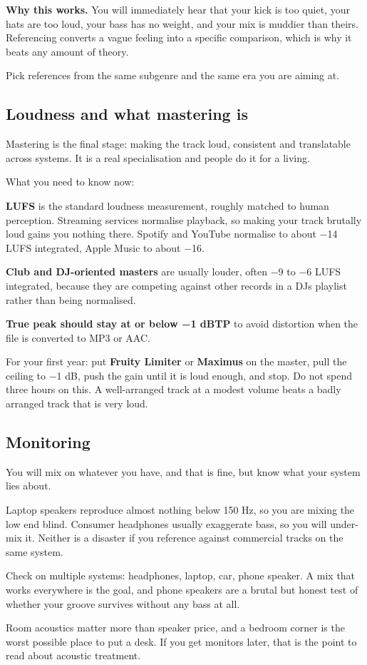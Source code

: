\begin{intuitionbox}
\textbf{Why this works.} You will immediately hear that your kick is too quiet, your hats are too
loud, your bass has no weight, and your mix is muddier than theirs. Referencing converts a
vague feeling into a specific comparison, which is why it beats any amount of theory.
\end{intuitionbox}

Pick references from the same subgenre and the same era you are aiming at.

\subsection{Loudness and what mastering is}\label{th07_mixing-loudness-and-what-mastering-is}

Mastering is the final stage: making the track loud, consistent and translatable across
systems. It is a real specialisation and people do it for a living.

What you need to know now:

\textbf{LUFS} is the standard loudness measurement, roughly matched to human perception.
Streaming services normalise playback, so making your track brutally loud gains you nothing
there. Spotify and YouTube normalise to about −14 LUFS integrated, Apple Music to about −16.

\textbf{Club and DJ-oriented masters} are usually louder, often −9 to −6 LUFS integrated, because
they are competing against other records in a DJ\textquotesingle s playlist rather than being normalised.

\textbf{True peak should stay at or below −1 dBTP} to avoid distortion when the file is converted
to MP3 or AAC.

For your first year: put \textbf{Fruity Limiter} or \textbf{Maximus} on the master, pull the ceiling to
−1 dB, push the gain until it is loud enough, and stop. Do not spend three hours on this. A
well-arranged track at a modest volume beats a badly arranged track that is very loud.

\subsection{Monitoring}\label{th07_mixing-monitoring}

You will mix on whatever you have, and that is fine, but know what your system lies about.

Laptop speakers reproduce almost nothing below 150 Hz, so you are mixing the low end blind.
Consumer headphones usually exaggerate bass, so you will under-mix it. Neither is a
disaster if you reference against commercial tracks on the same system.

Check on multiple systems: headphones, laptop, car, phone speaker. A mix that works
everywhere is the goal, and phone speakers are a brutal but honest test of whether your
groove survives without any bass at all.

Room acoustics matter more than speaker price, and a bedroom corner is the worst possible
place to put a desk. If you get monitors later, that is the point to read about acoustic
treatment.
